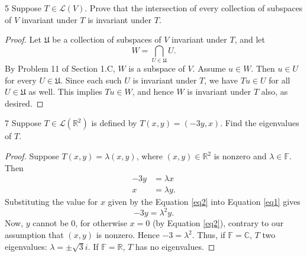 \documentclass[11pt]{extarticle}
\newenvironment{problem}[1]{\begin{prob*}{#1}{}}{\end{prob*}}
\newcommand{\R}{\mathbb{R}}
\newcommand{\C}{\mathbb{C}}
\newcommand{\F}{\mathbb{F}}
\newcommand{\Hom}{\mathcal{L}}
\begin{document}
\begin{problem}{5}
Suppose $T\in\Hom(V)$.  Prove that the intersection of every collection of subspaces of $V$ invariant under $T$ is invariant under $T$.
\end{problem}
\begin{proof}
Let $\mathfrak{U}$ be a collection of subspaces of $V$ invariant under $T$, and let 
\begin{equation*}
W = \bigcap_{U\in\mathfrak{U}} U.
\end{equation*}
By Problem 11 of Section 1.C, $W$ is a subspace of $V$.  Assume $u\in W$.  Then $u \in U$ for every $U\in\mathfrak{U}$.  Since each such $U$ is invariant under $T$, we have $Tu\in U$ for all $U\in\mathfrak{U}$ as well.  This implies $Tu\in W$, and hence $W$ is invariant under $T$ also, as desired.
\end{proof}

\begin{problem}{7}
Suppose $T\in\Hom(\R^2)$ is defined by $T(x,y)=(-3y,x)$.  Find the eigenvalues of $T$.
\end{problem}
\begin{proof}
Suppose $T(x,y) = \lambda(x,y)$, where $(x, y) \in\R^2$ is nonzero and $\lambda\in\F$.  Then
\begin{align}
-3y &= \lambda x \label{eq1}\\
x &= \lambda y. \label{eq2}
\end{align}
Substituting the value for $x$ given by the Equation \ref{eq2} into Equation \ref{eq1} gives
\begin{equation*}
-3y = \lambda^2y.
\end{equation*}
Now, $y$ cannot be $0$, for otherwise $x=0$ (by Equation \ref{eq2}), contrary to our assumption that $(x,y)$ is nonzero.  Hence $-3 = \lambda ^2$.  Thus, if $\F = \C$, $T$ two eigenvalues: $\lambda = \pm \sqrt{3}i$.  If $\F = \R$, $T$ has no eigenvalues.
\end{proof}
\end{document}

